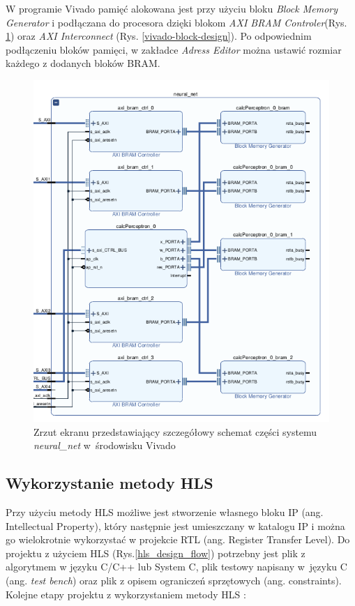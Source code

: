 W programie Vivado pamięć alokowana jest przy użyciu bloku 
\emph{Block Memory Generator} i podłączana do procesora dzięki blokom 
\emph{AXI BRAM Controler}(Rys. \ref{vivado-block-neural}) oraz \emph{AXI Interconnect} 
(Rys. \ref{vivado-block-design}). Po odpowiednim podłączeniu bloków pamięci, w zakładce \emph{Adress Editor} można ustawić rozmiar każdego z dodanych bloków BRAM.

\begin{figure}[!h]
  \centering
  \includegraphics[width=\textwidth]{img/vivado-neuralnet.png}
  \caption{Zrzut ekranu przedstawiający szczegółowy schemat części systemu \emph{neural\_net} w~środowisku Vivado}
  \label{vivado-block-neural}
\end{figure}

\subsection{Wykorzystanie metody HLS}
Przy użyciu metody HLS możliwe jest stworzenie własnego bloku IP (ang. 
Intellectual Property), który następnie jest umieszczany w katalogu IP i można 
go wielokrotnie wykorzystać w projekcie RTL (ang. Register Transfer Level).
Do projektu z użyciem HLS (Rys.\ref{hls_design_flow}) potrzebny jest plik 
z algorytmem w języku C/C++ lub System C, plik testowy napisany w~języku C 
(ang. \emph{test bench}) oraz plik z opisem ograniczeń sprzętowych (ang. constraints).
Kolejne etapy projektu z wykorzystaniem metody HLS \cite{hlsXilinxGuide}:

